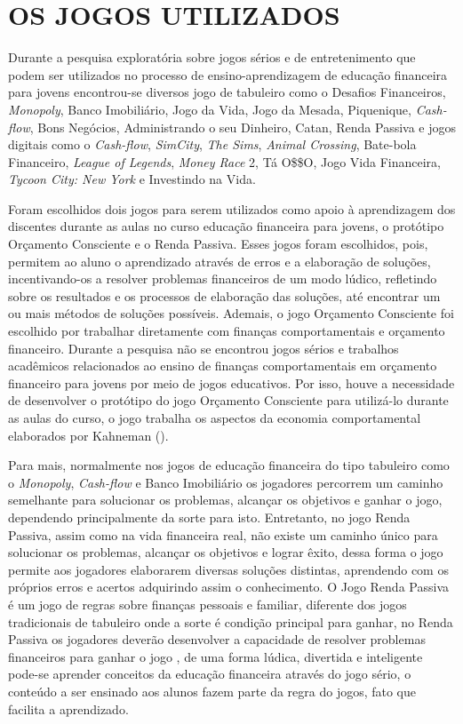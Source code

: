 \section{OS JOGOS UTILIZADOS}
Durante a pesquisa exploratória sobre jogos sérios e de entretenimento que podem ser utilizados no processo de ensino-aprendizagem de educação financeira para jovens encontrou-se diversos jogo de tabuleiro como o Desafios Financeiros, \textit{Monopoly}, Banco Imobiliário, Jogo da Vida, Jogo da Mesada, Piquenique, \textit{Cash-flow}, Bons Negócios, Administrando o seu Dinheiro, Catan, Renda Passiva e jogos digitais como o \textit{Cash-flow}, \textit{SimCity}, \textit{The Sims}, \textit{Animal Crossing}, Bate-bola Financeiro, \textit{League of Legends}, \textit{Money Race} 2, Tá O\$\$O, Jogo Vida Financeira, \textit{Tycoon City: New York} e Investindo na Vida.

Foram escolhidos dois jogos para serem utilizados como apoio à aprendizagem dos discentes durante as aulas no curso educação financeira para jovens, o protótipo Orçamento Consciente e o Renda Passiva. Esses jogos foram escolhidos, pois, permitem ao aluno o aprendizado através de erros e a elaboração de soluções, incentivando-os a resolver problemas financeiros de um modo lúdico, refletindo sobre os resultados e os processos de elaboração das soluções, até encontrar um ou mais métodos de soluções possíveis. Ademais, o jogo Orçamento Consciente foi escolhido por trabalhar diretamente com finanças comportamentais e orçamento financeiro. Durante a pesquisa não se encontrou jogos sérios e trabalhos acadêmicos relacionados ao ensino de finanças comportamentais em orçamento financeiro para jovens por meio de jogos educativos. Por isso, houve a necessidade de desenvolver o protótipo do jogo Orçamento Consciente para utilizá-lo durante as aulas do curso, o jogo trabalha os aspectos da economia comportamental elaborados por Kahneman (\citeyear{kahneman2012}).

Para mais, normalmente nos jogos de educação financeira do tipo tabuleiro como o \textit{Monopoly}, \textit{Cash-flow} e Banco Imobiliário os jogadores percorrem um caminho semelhante para solucionar os problemas, alcançar os objetivos e ganhar o jogo, dependendo principalmente da sorte para isto. Entretanto, no jogo Renda Passiva, assim como na vida financeira real, não existe um caminho único para solucionar os problemas, alcançar os objetivos e lograr êxito, dessa forma o jogo permite aos jogadores elaborarem diversas soluções distintas, aprendendo com os próprios erros e acertos adquirindo assim o conhecimento. O Jogo Renda Passiva é um jogo de regras sobre finanças pessoais e familiar, diferente dos jogos tradicionais de tabuleiro onde a sorte é condição principal para ganhar, no Renda Passiva os jogadores deverão desenvolver a capacidade de resolver problemas financeiros para ganhar o jogo \cite{frechiani2019a}, de uma forma lúdica, divertida e inteligente pode-se aprender conceitos da educação financeira através do jogo sério, o conteúdo a ser ensinado aos alunos fazem parte da regra do jogos, fato que facilita a aprendizado.

